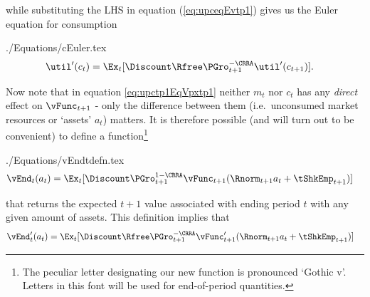 \documentclass[titlepage]{\econtex}
\begin{document}
while substituting the LHS in equation (\ref{eq:upceqEvtp1})
gives us the Euler equation for consumption
\begin{verbatimwrite}{./Equations/cEuler.tex}
  \begin{equation}\begin{gathered}\begin{aligned}
    \util^{\prime}({c}_{t})  & = \Ex_{t}[\Discount\Rfree \PGro_{t+1}^{-\CRRA}\util^{\prime}({c}_{t+1})]. \label{eq:cEuler}
  \end{aligned}\end{gathered}\end{equation}
\end{verbatimwrite}


Now note that in equation \eqref{eq:upctp1EqVpxtp1} neither ${m}_{t}$ nor
${c}_{t}$ has any \textit{direct} effect on $\null{\vFunc}_{t+1}$ - only the difference between them (i.e.\  unconsumed market resources or `assets' ${a}_t$) matters.  It is therefore possible (and will turn
out to be convenient) to define a function\footnote{The peculiar letter designating our new function is pronounced `Gothic v'.  Letters in this font
  will be used for end-of-period quantities.}
\begin{verbatimwrite}{./Equations/vEndtdefn.tex}
  \begin{equation}\begin{gathered}\begin{aligned}
    {\vEnd}_{t}({a}_{t})  & = \Ex_{t}[\Discount \PGro_{t+1}^{1-\CRRA}\null{\vFunc}_{t+1}(\Rnorm_{t+1} {a}_{t}+{\tShkEmp}_{t+1})]  \label{eq:vEndtdefn}
  \end{aligned}\end{gathered}\end{equation}
\end{verbatimwrite}

that returns the expected $t+1$ value associated with ending period
$t$ with any given amount of
 assets.  This definition
implies that
\begin{equation}\begin{gathered}\begin{aligned}
  {\vEnd}_{t}^{\prime}({a}_{t})  & = \Ex_{t}[\Discount \Rfree \PGro_{t+1}^{-\CRRA} \null{\vFunc}_{t+1}^{\prime}(\Rnorm_{t+1} {a}_{t}+{\tShkEmp}_{t+1})]  \label{eq:vEndPrimetdefn}
\end{aligned}\end{gathered}\end{equation}
\end{document}
